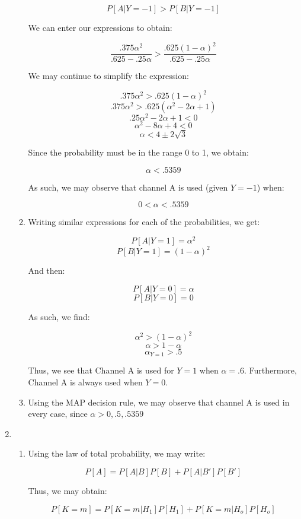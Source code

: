 \begin{enumerate}
\begin{enumerate}
        $$P[A|Y=-1]>P[B|Y=-1]$$

        We can enter our expressions to obtain:

        $$\frac{.375\alpha^2}{.625-.25\alpha}>\frac{.625(1-\alpha)^2}{.625-.25\alpha}$$

        We may continue to simplify the expression:

        $$.375\alpha^2>.625(1-\alpha)^2$$
        $$.375\alpha^2>.625(\alpha^2-2\alpha+1)$$
        $$.25\alpha^2-2\alpha+1<0$$
        $$\alpha^2-8\alpha+4<0$$
        $$\alpha<4\pm 2\sqrt{3}$$

        Since the probability must be in the range 0 to 1, we obtain:

        $$\alpha<.5359$$

        As such, we may observe that channel A is used (given $Y=-1$) when:

        $$\boxed{0<\alpha<.5359}$$

      \item Writing similar expressions for each of the probabilities, we get:

        $$P[A|Y=1]=\alpha^2$$
        $$P[B|Y=1]=(1-\alpha)^2$$

        And then:

        $$P[A|Y=0]=\alpha$$
        $$P[B|Y=0]=0$$

        As such, we find:

        $$\alpha^2>(1-\alpha)^2$$
        $$\alpha>1-\alpha$$
        $$\alpha_{Y=1}>.5$$

        Thus, we see that Channel A is used for $Y=1$ when $\alpha=.6$. Furthermore, Channel A is always used when $Y=0$.

      \item Using the MAP decision rule, we may observe that channel A is used in every case, since $\alpha>0,.5,.5359$

    \end{enumerate}

  \item

    \begin{enumerate}

      \item Using the law of total probability, we may write:

        $$P[A]=P[A|B]P[B]+P[A|B']P[B']$$

        Thus, we may obtain:

        $$P[K=m]=P[K=m|H_1]P[H_1]+P[K=m|H_o]P[H_o]$$


\end{enumerate}
\end{enumerate}
